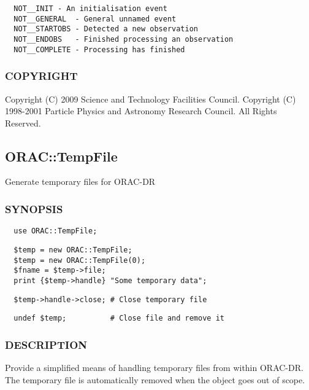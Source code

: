\begin{verbatim}
  NOT__INIT - An initialisation event
  NOT__GENERAL  - General unnamed event
  NOT__STARTOBS - Detected a new observation
  NOT__ENDOBS   - Finished processing an observation
  NOT__COMPLETE - Processing has finished
\end{verbatim}
\subsubsection*{COPYRIGHT\label{ORAC::Print_COPYRIGHT}}


Copyright (C) 2009 Science and Technology Facilities Council.
Copyright (C) 1998-2001 Particle Physics and Astronomy Research
Council. All Rights Reserved.

\subsection{ORAC::TempFile\label{ORAC::TempFile}}


Generate temporary files for ORAC-DR

\subsubsection*{SYNOPSIS\label{ORAC::TempFile_SYNOPSIS}}
\begin{verbatim}
  use ORAC::TempFile;
\end{verbatim}
\begin{verbatim}
  $temp = new ORAC::TempFile;
  $temp = new ORAC::TempFile(0);
  $fname = $temp->file;
  print {$temp->handle} "Some temporary data";
\end{verbatim}
\begin{verbatim}
  $temp->handle->close; # Close temporary file
\end{verbatim}
\begin{verbatim}
  undef $temp;          # Close file and remove it
\end{verbatim}
\subsubsection*{DESCRIPTION\label{ORAC::TempFile_DESCRIPTION}}


Provide a simplified means of handling temporary files from within
ORAC-DR. The temporary file is automatically removed when the
object goes out of scope.



